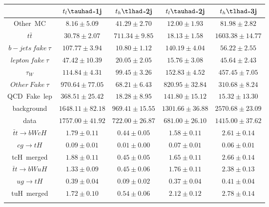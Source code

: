 \centering
\begin{tabular}{ccccc} \toprule\toprule
 & $t_{l}\tauhad$-1j & $t_{h}\tlhad$-2j & $t_{l}\tauhad$-2j & $t_{h}\tlhad$-3j\\\midrule
Other~MC & $8.16\pm5.09$ & $41.29\pm2.70$ & $12.00\pm1.93$ & $81.98\pm2.82$\\
$t\bar{t}$ & $30.78\pm2.07$ & $711.34\pm9.85$ & $18.13\pm1.58$ & $1603.38\pm14.77$\\
$b-jets~fake~\tau$ & $107.77\pm3.94$ & $10.80\pm1.12$ & $140.19\pm4.04$ & $56.22\pm2.55$\\
$lepton~fake~\tau$ & $47.42\pm10.39$ & $20.05\pm2.05$ & $15.76\pm3.08$ & $45.64\pm2.43$\\
$\tau_{W}$ & $114.84\pm4.31$ & $99.45\pm3.26$ & $152.83\pm4.52$ & $457.45\pm7.05$\\
$Other~Fake~\tau$ & $970.64\pm77.05$ & $68.21\pm6.43$ & $820.95\pm32.84$ & $310.68\pm8.24$\\
QCD~Fake~lep & $368.51\pm25.42$ & $18.28\pm8.95$ & $141.80\pm15.12$ & $15.32\pm13.30$\\
background & $1648.11\pm82.18$ & $969.41\pm15.55$ & $1301.66\pm36.88$ & $2570.68\pm23.09$\\
data & $1757.00\pm41.92$ & $722.00\pm26.87$ & $681.00\pm26.10$ & $1415.00\pm37.62$\\
$\bar{t}t\to bWcH$ & $1.79\pm0.11$ & $0.44\pm0.05$ & $1.58\pm0.11$ & $2.61\pm0.14$\\
$cg\to tH$ & $0.09\pm0.01$ & $0.01\pm0.00$ & $0.07\pm0.01$ & $0.06\pm0.01$\\
tcH~merged & $1.88\pm0.11$ & $0.45\pm0.05$ & $1.65\pm0.11$ & $2.66\pm0.14$\\
$\bar{t}t\to bWuH$ & $1.33\pm0.09$ & $0.45\pm0.06$ & $1.76\pm0.11$ & $2.38\pm0.13$\\
$ug\to tH$ & $0.39\pm0.04$ & $0.09\pm0.02$ & $0.37\pm0.04$ & $0.41\pm0.04$\\
tuH~merged & $1.72\pm0.10$ & $0.54\pm0.06$ & $2.12\pm0.12$ & $2.78\pm0.14$\\
\bottomrule\bottomrule\\
\end{tabular}
